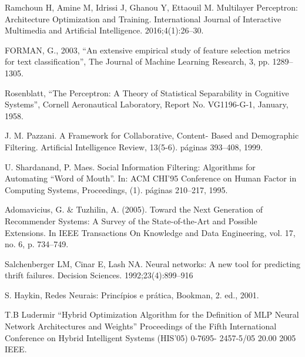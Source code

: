 \documentclass[conference]{IEEEtran}
\begin{document}
\begin{thebibliography}
 Ramchoun H, Amine M, Idrissi J, Ghanou Y, Ettaouil M. Multilayer Perceptron: Architecture Optimization and Training. International Journal of Interactive Multimedia and Artificial Intelligence. 2016;4(1):26–30.

FORMAN, G., 2003, “An extensive empirical study of feature selection metrics for
text classification”, The Journal of Machine Learning Research, 3, pp. 1289–
1305.

 Rosenblatt, “The Perceptron: A Theory of Statistical Separability in Cognitive Systems”, Cornell Aeronautical Laboratory, Report No. VG1196-G-1, January, 1958. 

 J. M. Pazzani. A Framework for Collaborative, Content- Based and Demographic Filtering. Artificial Intelligence Review, 13(5-6). páginas 393–408, 1999.

 U. Shardanand, P. Maes. Social Information Filtering: Algorithms for Automating “Word of Mouth”. In: ACM CHI’95 Conference on Human Factor in Computing Systems, Proceedings, (1). páginas 210–217, 1995.

 Adomavicius, G. & Tuzhilin, A. (2005). Toward the Next Generation of Recommender
Systems: A Survey of the State-of-the-Art and Possible Extensions. In IEEE
Transactions On Knowledge and Data Engineering, vol. 17, no. 6, p. 734–749.


 Salchenberger LM, Cinar E, Lash NA. Neural networks: A new tool for predicting thrift failures. Decision Sciences. 1992;23(4):899–916

 S. Haykin, Redes Neurais: Princípios e prática, Bookman, 2. ed., 2001.

 T.B Ludermir “Hybrid Optimization Algorithm for the Definition of MLP Neural Network Architectures and Weights” Proceedings of the Fifth International Conference on Hybrid Intelligent Systems (HIS’05) 0-7695- 2457-5/05 20.00 2005 IEEE.





\end{thebibliography}
\end{document}

